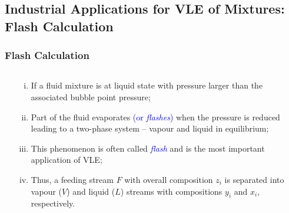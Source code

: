 \documentclass[10pt,compress,handout,ignorenonframetext,unknownkeysallowed]{beamer}
\begin{document}
\subsection{Industrial Applications for VLE of Mixtures: Flash Calculation}

\begin{frame}
  \frametitle{Flash Calculation}
  \begin{columns}
     \begin{column}[c]{0.5\linewidth}
     \end{column}
     \begin{column}[l]{0.5\linewidth}
        \begin{enumerate}[i)]
           \item<1-> If a fluid mixture is at liquid state with pressure larger than the associated bubble point pressure; %
           \item<2-> Part of the fluid evaporates \textcolor{blue}{(or {\it flashes})} when the pressure is reduced leading to a two-phase system -- vapour and liquid in equilibrium;
            \item<3-> This phenomenon is often called \textcolor{blue}{\it flash} and is the most important application of VLE;
            \item<4-> Thus, a feeding stream $F$ with overall composition $z_{i}$ is separated into vapour ($V$) and liquid ($L$) streams with compositions $y_{i}$ and $x_{i}$, respectively. 
        \end{enumerate}
     \end{column}
   \end{columns}
\end{frame}
\end{document}
